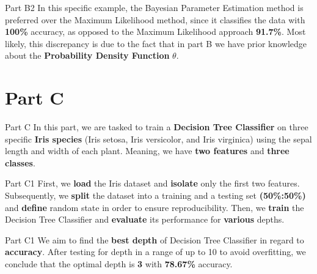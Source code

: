 \documentclass{beamer}
\begin{document}
    \begin{frame}{Part B2}
    \hfill\break\hfill\break
    In this specific example, the Bayesian Parameter Estimation method is preferred over the Maximum Likelihood method, since it classifies the data with \textbf{100\%} accuracy, as opposed to the Maximum Likelihood approach \textbf{91.7\%}. Most likely, this discrepancy is due to the fact that in part B we have prior knowledge about the \textbf{Probability Density Function} $\theta$.
    \end{frame}

\section{Part C}
    \begin{frame}{Part C}
        In this part, we are tasked to train a \textbf{Decision Tree Classifier} on three specific \textbf{Iris species} (Iris setosa, Iris versicolor, and Iris virginica) using the sepal length and width of each plant.
        \hfill\break\hfill\break
        Meaning, we have \textbf{two features} and \textbf{three classes}.
    \end{frame}

    \begin{frame}{Part C1}
        First, we \textbf{load} the Iris dataset and \textbf{isolate} only the first two features. Subsequently, we \textbf{split} the dataset into a training and a testing set \textbf{(50\%:50\%)} and \textbf{define} random state in order to ensure reproducibility.
        \hfill\break\hfill\break
        Then, we \textbf{train} the Decision Tree Classifier and \textbf{evaluate} its performance for \textbf{various} depths.
    \end{frame}

    \begin{frame}{Part C1}
        We aim to find the \textbf{best depth} of Decision Tree Classifier in regard to \textbf{accuracy}.
        \hfill\break\hfill\break
        After testing for depth in a range of up to 10 to avoid overfitting, we conclude that the optimal depth is \textbf{3} with \textbf{78.67\%} accuracy.
    \end{frame}
\end{document}
